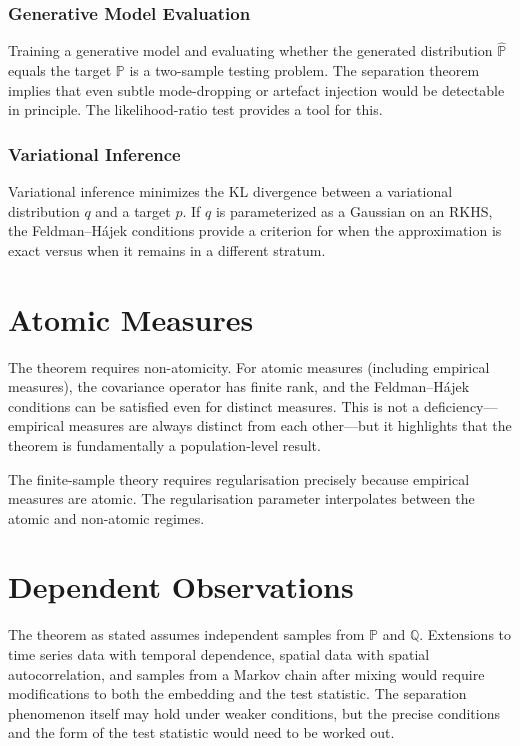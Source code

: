 \documentclass[12pt, oneside]{book}
\theoremstyle{plain}
\theoremstyle{definition}
\newcommand{\PP}{\mathbb{P}}
\newcommand{\QQ}{\mathbb{Q}}
\begin{document}
\subsubsection{Generative Model Evaluation}
Training a generative model and evaluating whether the generated distribution $\hat{\PP}$ equals the target $\PP$ is a two-sample testing problem. The separation theorem implies that even subtle mode-dropping or artefact injection would be detectable in principle. The likelihood-ratio test provides a tool for this.

\subsubsection{Variational Inference}
Variational inference minimizes the KL divergence between a variational distribution $q$ and a target $p$. If $q$ is parameterized as a Gaussian on an RKHS, the Feldman--H\'ajek conditions provide a criterion for when the approximation is exact versus when it remains in a different stratum.

\section{Atomic Measures}

The theorem requires non-atomicity. For atomic measures (including empirical measures), the covariance operator has finite rank, and the Feldman--H\'ajek conditions can be satisfied even for distinct measures. This is not a deficiency---empirical measures are always distinct from each other---but it highlights that the theorem is fundamentally a population-level result.

The finite-sample theory requires regularisation precisely because empirical measures are atomic. The regularisation parameter interpolates between the atomic and non-atomic regimes.

\section{Dependent Observations}

The theorem as stated assumes independent samples from $\PP$ and $\QQ$. Extensions to time series data with temporal dependence, spatial data with spatial autocorrelation, and samples from a Markov chain after mixing would require modifications to both the embedding and the test statistic. The separation phenomenon itself may hold under weaker conditions, but the precise conditions and the form of the test statistic would need to be worked out.
\end{document}
